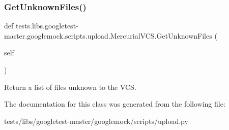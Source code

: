 \subsubsection{\texorpdfstring{Get\+Unknown\+Files()}{GetUnknownFiles()}}
{\footnotesize\ttfamily def tests.\+libs.\+googletest-\/master.\+googlemock.\+scripts.\+upload.\+Mercurial\+V\+C\+S.\+Get\+Unknown\+Files (\begin{DoxyParamCaption}\item[{}]{self }\end{DoxyParamCaption})}

\begin{DoxyVerb}Return a list of files unknown to the VCS.\end{DoxyVerb}
 

The documentation for this class was generated from the following file\+:\begin{DoxyCompactItemize}
\item 
tests/libs/googletest-\/master/googlemock/scripts/upload.\+py\end{DoxyCompactItemize}
